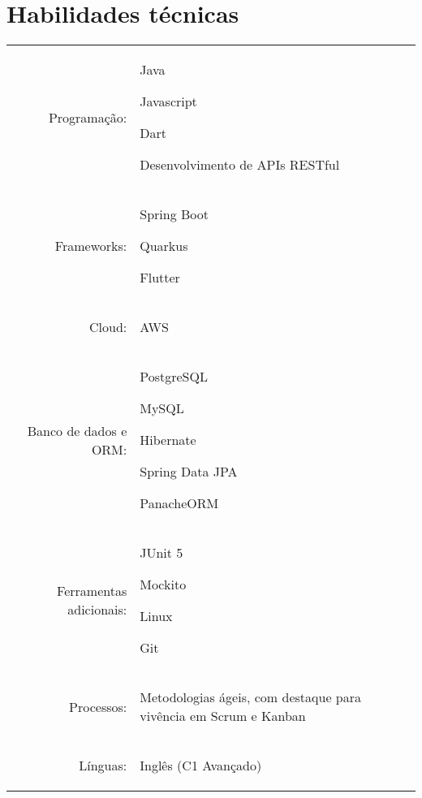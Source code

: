 \documentclass[a4paper,12pt]{article}
\newcommand{\postheadingspacing}{\vspace{6pt}}
\begin{document}
\section{Habilidades técnicas}
\postheadingspacing
\begin{tabular}{rp{15.2cm}}
\raggedleft Programação:
& \begin{itemize*}[label=\Large\textbullet]
    \item Java
    \item Javascript
    \item Dart
    \item Desenvolvimento de APIs RESTful
\end{itemize*}\\
\raggedleft Frameworks:
& \begin{itemize*}[label=\Large\textbullet]
    \item Spring Boot
    \item Quarkus
    \item Flutter
\end{itemize*}\\
\raggedleft Cloud:
& \begin{itemize*}[label=\Large\textbullet]
    \item AWS
\end{itemize*}\\
\raggedleft Banco de dados e ORM:
& \begin{itemize*}[label=\Large\textbullet]
    \item PostgreSQL
    \item MySQL
    \item Hibernate
    \item Spring Data JPA
    \item PanacheORM
\end{itemize*}\\
\raggedleft Ferramentas adicionais:
& \begin{itemize*}[label=\Large\textbullet]
    \item JUnit 5
    \item Mockito
    \item Linux
    \item Git
\end{itemize*}\\
\raggedleft Processos:
& \begin{itemize*}[label=\Large\textbullet]
    \item Metodologias ágeis, com destaque para vivência em Scrum e Kanban
\end{itemize*}\\
\raggedleft Línguas:
& \begin{itemize*}[label=\Large\textbullet]
    \item Inglês (C1 Avançado)
\end{itemize*}\\
\end{tabular}
\end{document}
